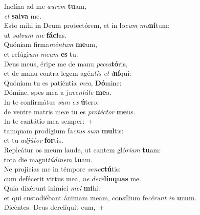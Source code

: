 \evenverse Inclína ad me \textit{au}\textit{rem} \textbf{tu}am,~\*\\
\evenverse \textit{et} \textbf{sal}\textbf{va} me.\\
\oddverse Esto mihi in Deum protectórem, et in lo\textit{cum} \textit{mu}\textbf{ní}tum:~\*\\
\oddverse ut \textit{sal}\textit{vum} \textit{me} \textbf{fá}\textbf{ci}as.\\
\evenverse Quóniam firma\textit{mén}\textit{tum} \textbf{me}um,~\*\\
\evenverse et refúgi\textit{um} \textit{me}\textit{um} \textbf{es} tu.\\
\oddverse Deus meus, éripe me de manu \textit{pec}\textit{ca}\textbf{tó}ris,~\*\\
\oddverse et de manu contra legem agén\textit{tis} \textit{et} \textit{i}\textbf{ní}qui:\\
\evenverse Quóniam tu es patiéntia \textit{me}\textit{a}, \textbf{Dó}mine:~\*\\
\evenverse Dómine, spes mea a ju\textit{ven}\textit{tú}\textit{te} \textbf{me}a.\\
\oddverse In te confirmátus \textit{sum} \textit{ex} \textbf{ú}tero:~\*\\
\oddverse de ventre matris meæ tu es \textit{pro}\textit{té}\textit{ctor} \textbf{me}us.\\
\evenverse In te cantátio mea semper:~+\\
\evenverse  tamquam prodígium fa\textit{ctus} \textit{sum} \textbf{mul}tis:~\*\\
\evenverse et tu \textit{ad}\textit{jú}\textit{tor} \textbf{for}tis.\\
\oddverse Repleátur os meum laude, ut cantem gló\textit{ri}\textit{am} \textbf{tu}am:~\*\\
\oddverse tota die magni\textit{tú}\textit{di}\textit{nem} \textbf{tu}am.\\
\evenverse Ne projícias me in témpore \textit{se}\textit{ne}\textbf{ctú}tis:~\*\\
\evenverse cum defécerit virtus mea, \textit{ne} \textit{de}\textit{re}\textbf{lín}\textbf{quas} me.\\
\oddverse Quia dixérunt inimíci \textit{me}\textit{i} \textbf{mi}hi:~\*\\
\oddverse et qui custodiébant ánimam meam, consílium fe\textit{cé}\textit{runt} \textit{in} \textbf{u}num.\\
\evenverse Dicéntes: Deus derelíquit eum,~+\\

